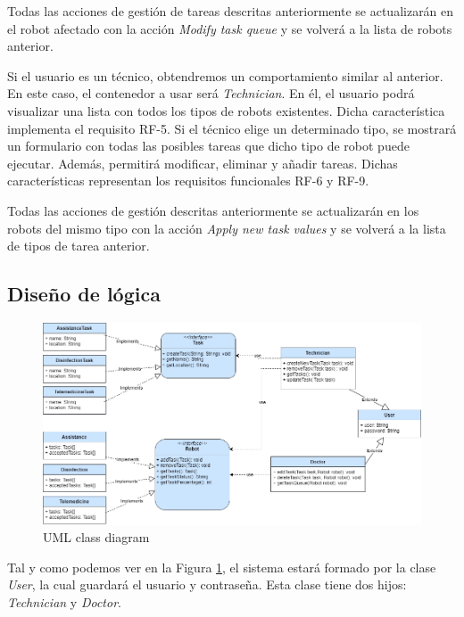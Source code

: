 Todas las acciones de gestión de tareas descritas anteriormente se actualizarán en el robot afectado con la acción \textit{Modify task queue} y se volverá a la lista de robots anterior.

Si el usuario es un técnico, obtendremos un comportamiento similar al anterior. En este caso, el contenedor a usar será \textit{Technician}. En él, el usuario podrá visualizar una lista con todos los tipos de robots existentes. Dicha característica implementa el requisito RF-5. Si el técnico elige un determinado tipo, se mostrará un formulario con todas las posibles tareas que dicho tipo de robot puede ejecutar. Además, permitirá modificar, eliminar y añadir tareas. Dichas características representan los requisitos funcionales RF-6 y RF-9.

Todas las acciones de gestión descritas anteriormente se actualizarán en los robots del mismo tipo con la acción \textit{Apply new task values} y se volverá a la lista de tipos de tarea anterior.

\subsection{Diseño de lógica}

\begin{figure}[H]
	\centering
	\includegraphics[width=1\textwidth]{images/DiagramaClasesWeb.drawio.png}
	\caption{UML class diagram}
	\label{fig:UMLModel}
\end{figure}
 Tal y como podemos ver en la Figura \ref{fig:UMLModel}, el sistema estará formado por la clase \textit{User}, la cual guardará el usuario y contraseña. Esta clase tiene dos hijos: \textit{Technician} y \textit{Doctor}.
 
